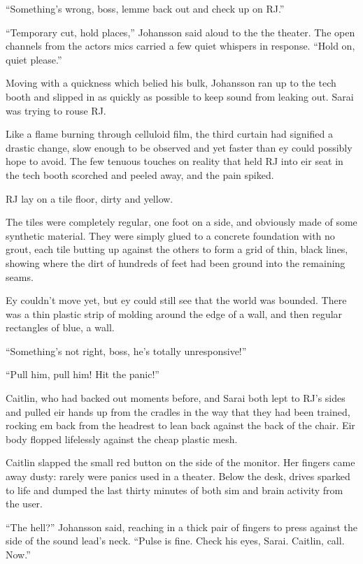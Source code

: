 ``Something's wrong, boss, lemme back out and check up on RJ.''

``Temporary cut, hold places,'' Johansson said aloud to the the theater.  The open channels from the actors mics carried a few quiet whispers in response.  ``Hold on, quiet please.''

Moving with a quickness which belied his bulk, Johansson ran up to the tech booth and slipped in as quickly as possible to keep sound from leaking out.  Sarai was trying to rouse RJ.

\secdiv

Like a flame burning through celluloid film, the third curtain had signified a drastic change, slow enough to be observed and yet faster than ey could possibly hope to avoid.  The few tenuous touches on reality that held RJ into eir seat in the tech booth scorched and peeled away, and the pain spiked.

RJ lay on a tile floor, dirty and yellow.

The tiles were completely regular, one foot on a side, and obviously made of some synthetic material.  They were simply glued to a concrete foundation with no grout, each tile butting up against the others to form a grid of thin, black lines, showing where the dirt of hundreds of feet had been ground into the remaining seams.

Ey couldn't move yet, but ey could still see that the world was bounded.  There was a thin plastic strip of molding around the edge of a wall, and then regular rectangles of blue, a wall.

\secdiv

``Something's not right, boss, he's totally unresponsive!''

``Pull him, pull him!  Hit the panic!''

Caitlin, who had backed out moments before, and Sarai both lept to RJ's sides and pulled eir hands up from the cradles in the way that they had been trained, rocking em back from the headrest to lean back against the back of the chair. Eir body flopped lifelessly against the cheap plastic mesh.

Caitlin slapped the small red button on the side of the monitor.  Her fingers came away dusty: rarely were panics used in a theater.  Below the desk, drives sparked to life and dumped the last thirty minutes of both sim and brain activity from the user.

``The hell?'' Johansson said, reaching in a thick pair of fingers to press against the side of the sound lead's neck.  ``Pulse is fine.  Check his eyes, Sarai.  Caitlin, call.  Now.''

